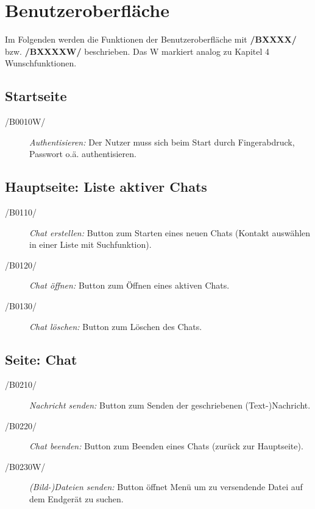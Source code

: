 \section{Benutzeroberfläche}
\textnormal{Im Folgenden werden die Funktionen der Benutzeroberfläche mit \textbf{/BXXXX/} bzw. \textbf{/BXXXXW/} beschrieben.
    Das W markiert analog zu Kapitel 4 Wunschfunktionen.}

\subsection{Startseite}
		\begin{description}
			\item[/B0010W/]
				\textit{Authentisieren:}
					\textnormal{Der Nutzer muss sich beim Start durch Fingerabdruck, Passwort o.ä. authentisieren.}
		\end{description}
\subsection{Hauptseite: Liste aktiver Chats }
		\begin{description}
			\item[/B0110/]
				\textit{Chat erstellen:}
					\textnormal{Button zum Starten eines neuen Chats (Kontakt auswählen in einer Liste mit Suchfunktion).}
			\item[/B0120/]
				\textit{Chat öffnen:}
					\textnormal{Button zum Öffnen eines aktiven Chats.}
			\item[/B0130/]
				\textit{Chat löschen:}
					\textnormal{Button zum Löschen des Chats.}
		\end{description}
\subsection{Seite: Chat}
		\begin{description}
			\item[/B0210/]
				\textit{Nachricht senden:}
					\textnormal{Button zum Senden der geschriebenen (Text-)Nachricht.}
			\item[/B0220/]
				\textit{Chat beenden:}
					\textnormal{Button zum Beenden eines Chats (zurück zur Hauptseite).}
			\item[/B0230W/]
				\textit{(Bild-)Dateien senden:}
					\textnormal{Button öffnet Menü um zu versendende Datei auf dem Endgerät zu suchen.}
		\end{description}
